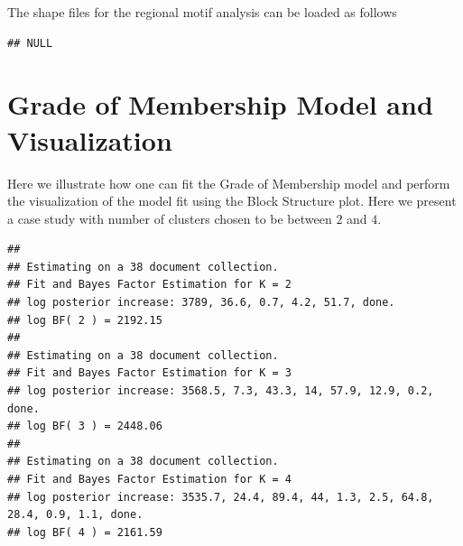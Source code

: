 \documentclass[12pt]{article}
\begin{document}
The shape files for the regional motif analysis can be loaded as follows

\begin{knitrout}
\color{fgcolor}\begin{kframe}
\begin{alltt}
 \hlkwb{<-} \hlopt{::}\hlstd{(}\hlstd{(}\hlstd{,} \hlstd{,}
                              \hlstd{=} \hlstd{))}
\end{alltt}


{\ttfamily\noindent{}}\begin{alltt}
\end{alltt}
\begin{verbatim}
## NULL
\end{verbatim}
\end{kframe}
\end{knitrout}

\section{Grade of Membership Model and Visualization}

Here we illustrate how one can fit the Grade of Membership model and perform the visualization of the model fit using the Block Structure plot. Here we present a case study with number of clusters chosen to be between $2$ and $4$.

\begin{knitrout}
\color{fgcolor}\begin{kframe}
\begin{alltt}
\hlkwb{=}\hlopt{$}
 \hlkwb{=} \hlopt{$}
 \hlkwb{<-} \hlopt{::} \hlstd{=}\hlopt{:}\hlstd{,} \hlstd{=}\hlstd{)}
\end{alltt}
\begin{verbatim}
## 
## Estimating on a 38 document collection.
## Fit and Bayes Factor Estimation for K = 2
## log posterior increase: 3789, 36.6, 0.7, 4.2, 51.7, done.
## log BF( 2 ) = 2192.15
## 
## Estimating on a 38 document collection.
## Fit and Bayes Factor Estimation for K = 3
## log posterior increase: 3568.5, 7.3, 43.3, 14, 57.9, 12.9, 0.2, done.
## log BF( 3 ) = 2448.06
## 
## Estimating on a 38 document collection.
## Fit and Bayes Factor Estimation for K = 4
## log posterior increase: 3535.7, 24.4, 89.4, 44, 1.3, 2.5, 64.8, 28.4, 0.9, 1.1, done.
## log BF( 4 ) = 2161.59
\end{verbatim}
\end{kframe}
\end{knitrout}
\end{document}

